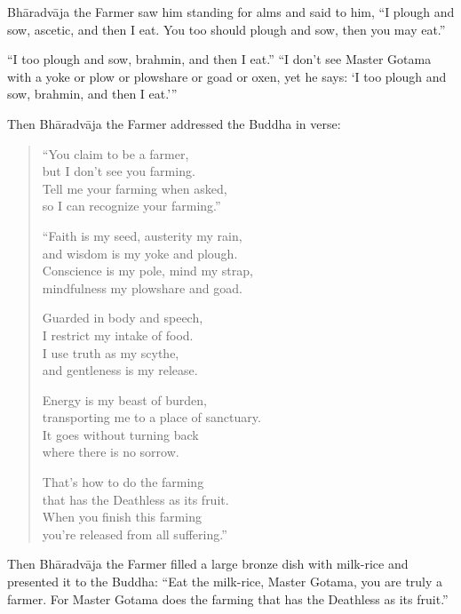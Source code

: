 \documentclass[12pt,openany]{book}%
\begin{document}
\textsanskrit{Bhāradvāja} the Farmer saw him standing for alms and said to him, “I plough and sow, ascetic, and then I eat. You too should plough and sow, then you may eat.” 

“I too plough and sow, brahmin, and then I eat.” “I don’t see Master Gotama with a yoke or plow or plowshare or goad or oxen, yet he says: ‘I too plough and sow, brahmin, and then I eat.’” 

Then \textsanskrit{Bhāradvāja} the Farmer addressed the Buddha in verse: 

\begin{verse}%
“You claim to be a farmer, \\
but I don’t see you farming. \\
Tell me your farming when asked, \\
so I can recognize your farming.” 

“Faith is my seed, austerity my rain, \\
and wisdom is my yoke and plough. \\
Conscience is my pole, mind my strap, \\
mindfulness my plowshare and goad. 

Guarded in body and speech, \\
I restrict my intake of food. \\
I use truth as my scythe, \\
and gentleness is my release. 

Energy is my beast of burden, \\
transporting me to a place of sanctuary. \\
It goes without turning back \\
where there is no sorrow. 

That’s how to do the farming \\
that has the Deathless as its fruit. \\
When you finish this farming \\
you’re released from all suffering.” 

%
\end{verse}

Then \textsanskrit{Bhāradvāja} the Farmer filled a large bronze dish with milk-rice and presented it to the Buddha: “Eat the milk-rice, Master Gotama, you are truly a farmer. For Master Gotama does the farming that has the Deathless as its fruit.” 
\end{document}
